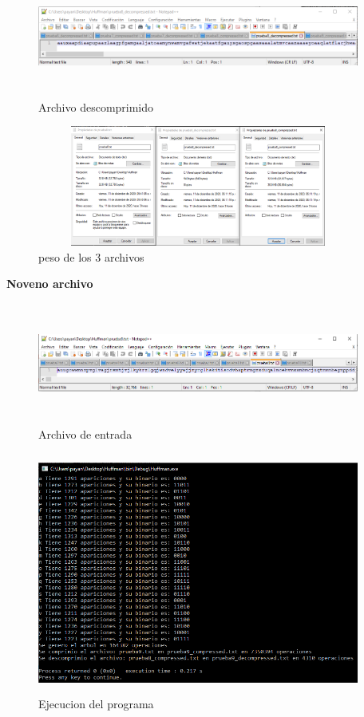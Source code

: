 \documentclass[spanish]{article}
\begin{document}
	\begin{figure}[H]
		\centering
		\includegraphics[width=400px,height=150px]{captura49}
		\caption{Archivo descomprimido}
	\end{figure}
	\begin{figure}[H]
		\centering
		\includegraphics[width=400px,height=150px]{captura50}
		\caption{peso de los 3 archivos}
	\end{figure}
	\textbf{Noveno archivo}
	\begin{figure}[H]
		\centering
		\includegraphics[width=400px,height=150px]{captura51}
		\caption{Archivo de entrada}
	\end{figure}
	\begin{figure}[H]
		\centering
		\includegraphics[width=400px,height=300px]{captura52}
		\caption{Ejecucion del programa}
	\end{figure}
\end{document}
